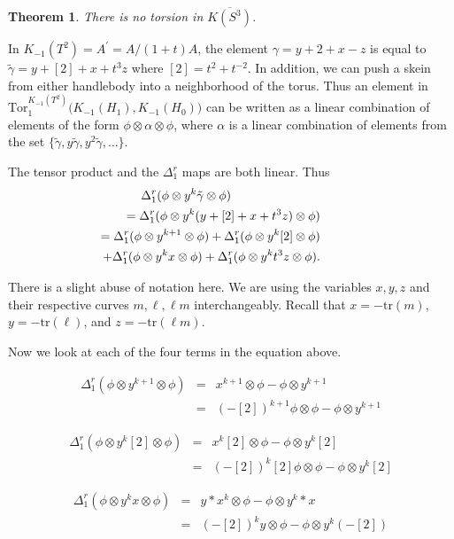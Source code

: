 \documentclass{slides}
\newcommand{\ot}{\otimes}
\newcommand{\tr}{\mathrm{tr}}
\newtheorem{theorem}{Theorem}
\begin{document}
\begin{slide}
\begin{theorem}
There is no torsion in $\overline{K(S^3)}$.
\label{thm-torsion-s3}
\end{theorem}

\proof
In $K_{-1}(T^2) = A^{\prime} = A / (1+t) A$, the
element $\gamma = y + 2 + x - z$ is equal to
$\tilde{\gamma} = y + [2] + x + t^3z$ where $[2] = t^2 + t^{-2}$.
In addition, we can push a skein from either handlebody into a neighborhood
of the torus.  Thus an element in
$\mathrm{Tor}_1^{K_{-1}(T^2)} \Big( K_{-1}(H_1), K_{-1}(H_0) \Big)$
can be written as a
linear combination of elements of the form $\phi \ot \alpha \ot \phi$, where
$\alpha$ is a linear combination of elements from the set
$\{ \tilde{\gamma}, y \tilde{\gamma}, y^2 \tilde{\gamma}, \dots \}$.

The tensor product and the $\Delta^r_1$ maps are both linear.  Thus
\begin{eqnarray}
\Delta^r_1(\phi \ot y^k \tilde{\gamma} \ot \phi) \nonumber \\
& & \hspace{-5cm} = \Delta^r_1(\phi \ot y^k (y + [2] + x + t^3 z) \ot \phi) \nonumber \\
& & \hspace{-5cm} = \Delta^r_1(\phi \ot y^{k+1} \ot \phi)
+ \Delta^r_1(\phi \ot y^k [2] \ot \phi) \nonumber \\
& & \hspace{-4cm} + \Delta^r_1(\phi \ot y^k x \ot \phi)
+ \Delta^r_1(\phi \ot y^k t^3 z \ot \phi). \nonumber
\end{eqnarray}
\end{slide}

\begin{slide}
There is a slight abuse of notation here.  We are using the
variables $x, y, z$ and their respective curves $m, \ell, \ell m$ interchangeably.
Recall that $x = -\tr(m)$, $y = -\tr(\ell)$, and $z = -\tr(\ell m)$.

Now we look at each of the four terms in the equation above.

\begin{eqnarray}
\Delta^r_1(\phi \ot y^{k+1} \ot \phi) & = &
x^{k+1} \ot \phi - \phi \ot y^{k+1} \nonumber \\
& = & (-[2])^{k+1} \phi \ot \phi - \phi \ot y^{k+1} \nonumber
\end{eqnarray}

\begin{eqnarray}
\Delta^r_1(\phi \ot y^k [2] \ot \phi) & = &
x^k [2] \ot \phi - \phi \ot y^k [2] \nonumber \\
& = & (-[2])^k[2] \phi \ot \phi - \phi \ot y^k [2] \nonumber
\end{eqnarray}

\begin{eqnarray}
\Delta^r_1(\phi \ot y^k x \ot \phi) & = &
y * x^k \ot \phi - \phi \ot y^k * x \nonumber \\
& = & (-[2])^k y \ot \phi - \phi \ot y^k (-[2]) \nonumber
\end{eqnarray}
\end{slide}
\end{document}
